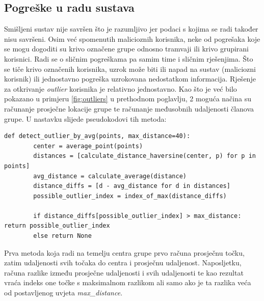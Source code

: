 \documentclass[times, utf8, diplomski]{fer}
\begin{document}
\subsection{Pogreške u radu sustava}
Smišljeni sustav nije savršen što je razumljivo jer podaci s kojima se radi također nisu savršeni. Osim već spomenutih malicioznih korisnika, neke od pogrešaka koje se mogu dogoditi su krivo označene grupe odnosno tramvaji ili krivo grupirani korisnici. Radi se o sličnim pogreškama pa samim time i sličnim rješenjima.
Što se tiče krivo označenih korisnika, uzrok može biti ili napad na sustav (maliciozni korisnik) ili jednostavno pogreška uzrokovana nedostatkom informacija. Rješenje za otkrivanje \emph{outlier} korisnika je relativno jednostavno. Kao što je već bilo pokazano u primjeru \ref{fig:outliers} u prethodnom poglavlju, 2 moguća načina su računanje prosječne lokacije grupe te računanje međusobnih udaljenosti članova grupe. U nastavku slijede pseudokodovi tih metoda:

\begin{lstlisting}[caption={Otkrivanje \emph{outliera} - prosječna lokacija},captionpos=b,label={kod:outlier_average}]
    def detect_outlier_by_avg(points, max_distance=40):
        center = average_point(points)
        distances = [calculate_distance_haversine(center, p) for p in points]
        avg_distance = calculate_average(distance)
        distance_diffs = [d - avg_distance for d in distances]
        possible_outlier_index = index_of_max(distance_diffs)

        if distance_diffs[possible_outlier_index] > max_distance: return possible_outlier_index
        else return None

\end{lstlisting}

Prva metoda koja radi na temelju centra grupe prvo računa prosječnu točku, zatim udaljenosti svih točaka do centra i prosječnu udaljenost. Naposljetku, računa razlike između prosječne udaljenosti i svih udaljenosti te kao rezultat vraća indeks one točke s maksimalnom razlikom ali samo ako je ta razlika veća od postavljenog uvjeta \emph{max\_distance}.
\end{document}
